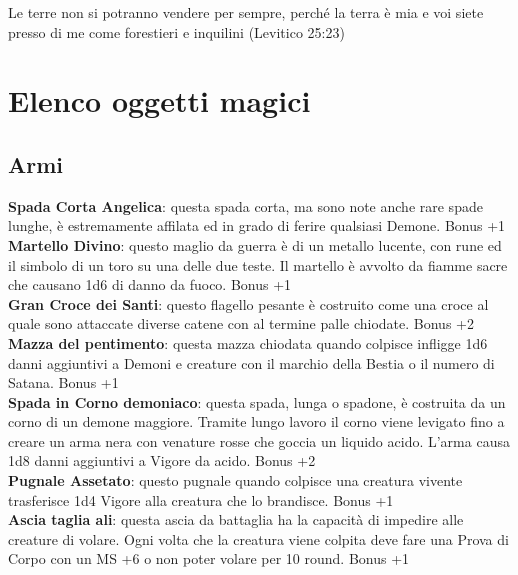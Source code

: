 \documentclass[a4paper,twoside,openany]{book}
\begin{document}
\begin{multicols}{2}
\begin{changemargin}{0.3cm}{0.3cm}
\begin{enfasi}
{Le terre non si potranno vendere per sempre, perché la terra è mia e voi siete presso di me come forestieri e inquilini (Levitico 25:23)
}\end{enfasi}\end{changemargin}\medskip


\section{Elenco oggetti magici}

\subsection{Armi}

\textbf{Spada Corta Angelica}: questa spada corta, ma sono note anche rare spade lunghe, è estremamente affilata ed in grado di ferire qualsiasi Demone. Bonus +1\\

\textbf{Martello Divino}: questo maglio da guerra è di un metallo lucente, con rune ed il simbolo di un toro su una delle due teste. Il martello è avvolto da fiamme sacre che causano 1d6 di danno da fuoco. Bonus +1\\

\textbf{Gran Croce dei Santi}: questo flagello pesante è costruito come una croce al quale sono attaccate diverse catene con al termine palle chiodate. Bonus +2\\

\textbf{Mazza del pentimento}: questa mazza chiodata quando colpisce infligge 1d6 danni aggiuntivi a Demoni e creature con il marchio della Bestia o il numero di Satana. Bonus +1\\

\textbf{Spada in Corno demoniaco}: questa spada, lunga o spadone, è costruita da un corno di un demone maggiore. Tramite lungo lavoro il corno viene levigato fino a creare un arma nera con venature rosse che goccia un liquido acido. L'arma causa 1d8 danni aggiuntivi a Vigore da acido. Bonus +2\\

\textbf{Pugnale Assetato}: questo pugnale quando colpisce una creatura vivente trasferisce 1d4 Vigore alla creatura che lo brandisce. Bonus +1\\

\textbf{Ascia taglia ali}: questa ascia da battaglia ha la capacità di impedire alle creature di volare. Ogni volta che la creatura viene colpita deve fare una Prova di Corpo con un MS +6 o non poter volare per 10 round. Bonus +1\\


\end{multicols}
\end{document}

